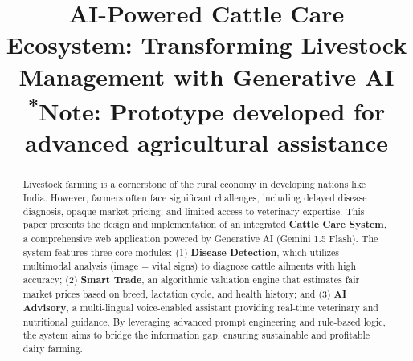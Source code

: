 \documentclass[conference]{IEEEtran}
\begin{document}
\title{AI-Powered Cattle Care Ecosystem: Transforming Livestock Management with Generative AI\\
{\footnotesize \textsuperscript{*}Note: Prototype developed for advanced agricultural assistance}
}

\author{
\and
{}
\and
{}
}

\maketitle

\begin{abstract}
Livestock farming is a cornerstone of the rural economy in developing nations like India. However, farmers often face significant challenges, including delayed disease diagnosis, opaque market pricing, and limited access to veterinary expertise. This paper presents the design and implementation of an integrated \textbf{Cattle Care System}, a comprehensive web application powered by Generative AI (Gemini 1.5 Flash). The system features three core modules: (1) \textbf{Disease Detection}, which utilizes multimodal analysis (image + vital signs) to diagnose cattle ailments with high accuracy; (2) \textbf{Smart Trade}, an algorithmic valuation engine that estimates fair market prices based on breed, lactation cycle, and health history; and (3) \textbf{AI Advisory}, a multi-lingual voice-enabled assistant providing real-time veterinary and nutritional guidance. By leveraging advanced prompt engineering and rule-based logic, the system aims to bridge the information gap, ensuring sustainable and profitable dairy farming.
\end{abstract}
\end{document}
